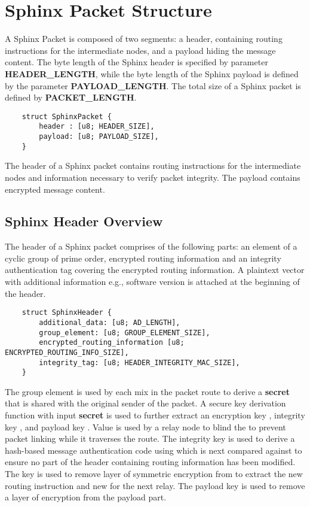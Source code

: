 \section{Sphinx Packet Structure}\label{sec:structure}

A Sphinx Packet is composed of two segments: a header, containing routing instructions for the intermediate nodes, and a payload hiding the message content. The byte length of the Sphinx header is specified by parameter \textbf{HEADER\_LENGTH}, while the byte length of the Sphinx payload is defined by the parameter \textbf{PAYLOAD\_LENGTH}. The total size of a Sphinx packet is defined by \textbf{PACKET\_LENGTH}.
\begin{verbatim}
    struct SphinxPacket {
        header : [u8; HEADER_SIZE],
        payload: [u8; PAYLOAD_SIZE],
    }
\end{verbatim}

The header of a Sphinx packet contains routing instructions for the intermediate nodes and information necessary to verify packet integrity. The payload contains encrypted message content.

\subsection{Sphinx Header Overview}\label{sec:header}

The header of a Sphinx packet comprises of the following parts: an element of a cyclic group of prime order, encrypted routing information and an integrity authentication tag covering the encrypted routing information. A plaintext vector with additional information e.g., software version is attached at the beginning of the header.

\begin{verbatim}
    struct SphinxHeader {
        additional_data: [u8; AD_LENGTH],
        group_element: [u8; GROUP_ELEMENT_SIZE],
        encrypted_routing_information [u8; ENCRYPTED_ROUTING_INFO_SIZE],
        integrity_tag: [u8; HEADER_INTEGRITY_MAC_SIZE],
    }
\end{verbatim}

The group element is used by each mix in the packet route to derive a \textbf{secret} that is shared with the original sender of the packet. A secure key derivation function \kdf with input \textbf{secret} is used to further extract an encryption key \hek, integrity key \ik, \blind and payload key \pk. Value \blind is used by a relay node to blind the \alp to prevent packet linking while it traverses the route. The integrity key \ik is used to derive a hash-based message authentication code using \bet which is next compared against \intag to ensure no part of the header containing routing information has been modified.
The key \hek is used to remove layer of symmetric encryption from \bet to extract the new routing instruction \bet and new \intag for the next relay. The payload key \pk is used to remove a layer of encryption from the payload part.




